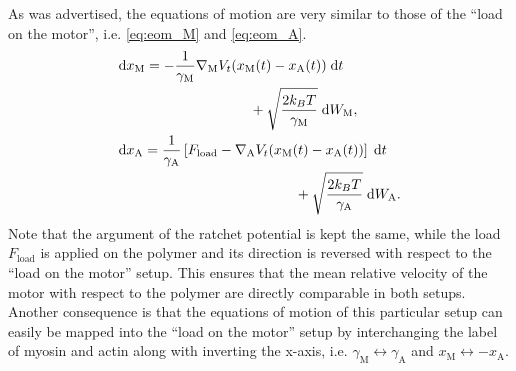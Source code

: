 \documentclass[aps,pre,twocolumn,showpacs,showkeys,superscriptaddress,floatfix]{revtex4-1}
\newcommand{\rmd}{{\mathrm d}}
\begin{document}
As was advertised, the equations of motion are very similar to those of the ``load on the motor'', i.e. \eqref{eq:eom_M} and \eqref{eq:eom_A}.
\begin{align}
&\begin{multlined}[b][.42\textwidth]
\rmd x_\text{M} = 
- \frac{1}{\gamma_\text{M}} \nabla_\text{M} V_t(x_\text{M}(t) - x_\text{A}(t)) \; \rmd t 
\\ 
+ \sqrt{ \frac{2 k_B T}{\gamma_\text{M}} } \; \rmd W_\text{M} ,
\end{multlined}
\label{eq:eom_M_lp} \\
&\begin{multlined}[b][.42\textwidth]
\rmd x_\text{A} = 
\frac{1}{\gamma_\text{A}} \left[ F_\text{load} - \nabla_\text{A} V_t(x_\text{M}(t) - x_\text{A}(t)) \right] \; \rmd t 
\\
+ \sqrt{ \frac{2 k_B T}{\gamma_\text{A}} } \; \rmd W_\text{A} .
\end{multlined}
\label{eq:eom_A_lp}
\end{align}
Note that the argument of the ratchet potential is kept the same, 
while the load $F_\text{load}$ is applied on the polymer and its direction is reversed with respect to the ``load on the motor'' setup. 
This ensures that the mean relative velocity of the motor with respect to the polymer are directly comparable in both setups. 
Another consequence is that the equations of motion of this particular setup can easily be mapped into the ``load on the motor'' setup by interchanging the label of myosin and actin 
along with inverting the x-axis, 
i.e. $\gamma_\text{M}\leftrightarrow\gamma_\text{A}$ and $x_\text{M}\leftrightarrow - x_\text{A}$.
\end{document}
